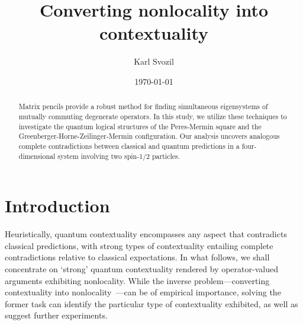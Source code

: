 \documentclass[
  twocolumn,
 showpacs,
 showkeys,
 preprintnumbers,
 amsmath,amssymb,
 aps,
 pra,
  longbibliography,
 floatfix,
 ]{revtex4-2}
\begin{document}
\title{Converting nonlocality into contextuality}



\author{Karl Svozil}




\date{\today}

\begin{abstract}
Matrix pencils provide a robust method for finding simultaneous eigensystems of mutually commuting degenerate operators. In this study, we utilize these techniques to investigate the quantum logical structures of the Peres-Mermin square and the Greenberger-Horne-Zeilinger-Mermin configuration. Our analysis uncovers analogous complete contradictions between classical and quantum predictions in a four-dimensional system involving two spin-1/2 particles.
\end{abstract}


\maketitle




\section{Introduction}


Heuristically, quantum contextuality encompasses any aspect that contradicts classical predictions, with strong types of contextuality entailing complete contradictions relative to classical expectations. In what follows, we shall concentrate on `strong' quantum contextuality rendered by operator-valued arguments exhibiting nonlocality. While the inverse problem---converting contextuality into nonlocality~\cite{cabello2020converting}---can be of empirical importance, solving the former task can identify the particular type of contextuality exhibited, as well as suggest further experiments.
\end{document}
